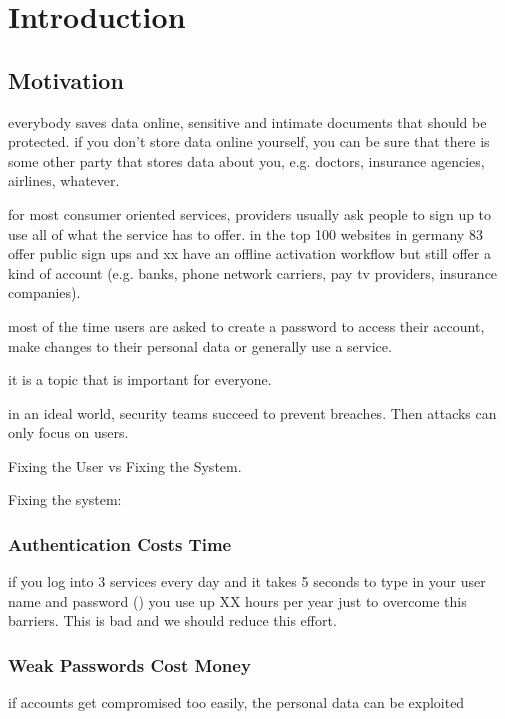 
\chapter[Introduction]{Introduction}\label{chap:intro}

\section{Motivation}

everybody saves data online, sensitive and intimate documents that should be protected.
if you don't store data online yourself, you can be sure that there is some other party
that stores data about you, e.g. doctors, insurance agencies, airlines, whatever. 

for most consumer oriented services, providers usually ask people to sign up to use
all of what the service has to offer. in the top 100 websites in germany 83 offer public sign ups and xx have an offline activation workflow but still offer a kind of account (e.g. banks, phone network carriers, pay tv providers, insurance companies). 

most of the time users are asked to create a password to access their account, make changes to their personal data or generally use a service. 

it is a topic that is important for everyone. 

in an ideal world, security teams succeed to prevent breaches. Then attacks can only focus on users. 

Fixing the User vs Fixing the System. 

Fixing the system: \cite{Schmidt2013Pitfalls}

\subsection{Authentication Costs Time}
if you log into 3 services every day and it takes 5 seconds to type in your user name and password (\ar) you use up XX hours per year just to overcome this barriers. This is bad and we should reduce this effort. 


\subsection{Weak Passwords Cost Money}
if accounts get compromised too easily, the personal data can be exploited 


